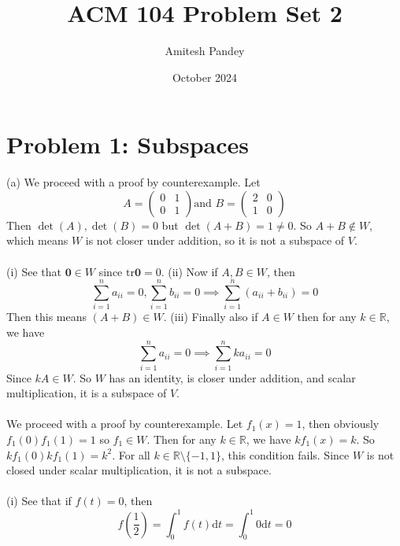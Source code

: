 \documentclass{article}
\title{ACM 104 Problem Set 2}
\author{Amitesh Pandey}
\date{October 2024}
\begin{document}
\maketitle
\section*{Problem 1: Subspaces}
(a) We proceed with a proof by counterexample. Let 
\begin{equation*}
    A = \begin{pmatrix}
        0 & 1\\
        0 & 1
    \end{pmatrix}\text{and } B = \begin{pmatrix}
        2 & 0\\
        1& 0
    \end{pmatrix}
\end{equation*}
Then $\det{(A)}, \det{(B)} = 0$ but $\det{(A+B)} = 1 \neq 0$. So $A+B \notin W$, which means $W$ is not closer under addition, so it is not a subspace of $V$. \\\\
 (i) See that $\mathbf{0} \in W$ since $\text{tr}\mathbf{0} = 0$. (ii) Now if $A, B \in W$, then
\begin{equation*}
    \sum_{i = 1}^{n}a_{ii} = 0, \sum_{i=1}^{n}b_{ii} = 0 \implies \sum_{i=1}^{n} (a_{ii} + b_{ii}) = 0
\end{equation*}
Then this means $(A+B) \in W$. (iii) Finally also if $A \in W$ then for any $k \in \mathbb{R}$, we have
\begin{equation*}
    \sum_{i=1}^{n} a_{ii} = 0 \implies \sum_{i=1}^{n}ka_{ii} = 0
\end{equation*}
Since $kA \in W$. So $W$ has an identity, is closer under addition, and scalar multiplication, it is a subspace of $V$.  \\\\
 We proceed with a proof by counterexample. Let $f_{1}(x) = 1$, then obviously $f_{1}(0)f_{1}(1) = 1$ so $f_{1} \in W$. Then for any $k \in \mathbb{R}$, we have $kf_{1}(x) = k$. So $kf_{1}(0)kf_{1}(1) = k^{2}$. For all $k \in \mathbb{R}\setminus\{-1,1\}$, this condition fails. Since $W$ is not closed under scalar multiplication, it is not a subspace. \\\\
 (i) See that if $f(t) = 0$, then
\begin{equation*}
    f\left(\frac{1}{2}\right) = \int_{0}^{1}f(t)\text{d}t = \int_{0}^{1}0\text{d}t = 0
\end{equation*}
\end{document}
